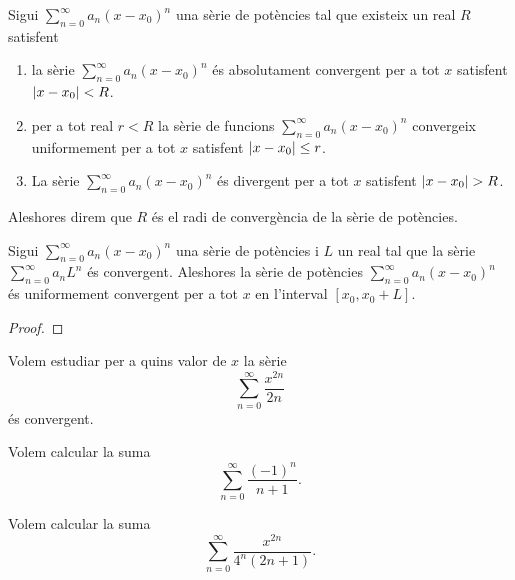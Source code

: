 \documentclass[../Apunts.tex]{subfiles}
\begin{document}
	\begin{definition}
		Sigui \(\sum_{n=0}^{\infty}a_{n}(x-x_{0})^{n}\) una sèrie de potències tal que existeix un real \(R\) satisfent
		\begin{enumerate}
			\item la sèrie \(\sum_{n=0}^{\infty}a_{n}(x-x_{0})^{n}\) és absolutament convergent per a tot \(x\) satisfent \(\abs{x-x_{0}}<R\).
			\item per a tot real \(r<R\) la sèrie de funcions \(\sum_{n=0}^{\infty}a_{n}(x-x_{0})^{n}\) convergeix uniformement per a tot \(x\) satisfent \(\abs{x-x_{0}}\leq r\).
			\item La sèrie \(\sum_{n=0}^{\infty}a_{n}(x-x_{0})^{n}\) és divergent per a tot \(x\) satisfent \(\abs{x-x_{0}}>R\).
		\end{enumerate}
		Aleshores direm que \(R\) és el radi de convergència de la sèrie de potències.
	\end{definition}
	\begin{theorem}
		\label{thm:Teorema d'Abel}
		Sigui \(\sum_{n=0}^{\infty}a_{n}(x-x_{0})^{n}\) una sèrie de potències i \(L\) un real tal que la sèrie \(\sum_{n=0}^{\infty}a_{n}L^{n}\) és convergent. Aleshores la sèrie de potències \(\sum_{n=0}^{\infty}a_{n}(x-x_{0})^{n}\) és uniformement convergent per a tot \(x\) en l'interval \([x_{0},x_{0}+L]\).
		\begin{proof}
		\end{proof}
	\end{theorem}
	\begin{example}
		\label{ex:radi de convergència d'una sèrie de potències}
		Volem estudiar per a quins valor de \(x\) la sèrie
		\[\sum_{n=0}^{\infty}\frac{x^{2n}}{2n}\]
		és convergent.
		\begin{solution}
		\end{solution}
	\end{example}
	\begin{example}
		\label{ex:calcular una suma trobant un Taylor equivalent}
		Volem calcular la suma
		\[\sum_{n=0}^{\infty}\frac{(-1)^{n}}{n+1}.\] %
		\begin{solution}
		\end{solution}
	\end{example}
	\begin{example}
		\label{ex:calcular el radi de convergència i suma d'una sèrie de potències}
		Volem calcular la suma
		\[\sum_{n=0}^{\infty}\frac{x^{2n}}{4^{n}(2n+1)}.\] %
		\begin{solution}
		\end{solution}
	\end{example}
\end{document}
